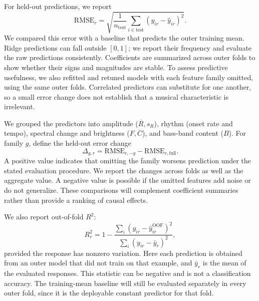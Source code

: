 For held-out predictions, we report
\begin{equation}
 \mathrm{RMSE}_r=
 \sqrt{\frac{1}{n_{\mathrm{test}}}\sum_{i\in\mathrm{test}}
 (y_{ir}-\widehat y_{ir})^2}.
\end{equation}
We compared this error with a baseline that predicts the outer training mean. Ridge predictions can fall outside $[0,1]$; we report their frequency and evaluate the raw predictions consistently. Coefficients are summarized across outer folds to show whether their signs and magnitudes are stable. To assess predictive usefulness, we also refitted and retuned models with each feature family omitted, using the same outer folds. Correlated predictors can substitute for one another, so a small error change does not establish that a musical characteristic is irrelevant.

We grouped the predictors into amplitude ($\overline R,s_R$), rhythm (onset rate and tempo), spectral change and brightness ($F,\overline C$), and bass-band content ($B$). For family $g$, define the held-out error change
\begin{equation}
 \Delta_{g,r}=\mathrm{RMSE}_{r,-g}-\mathrm{RMSE}_{r,\mathrm{full}}.
\end{equation}
A positive value indicates that omitting the family worsens prediction under the stated evaluation procedure. We report the changes across folds as well as the aggregate value. A negative value is possible if the omitted features add noise or do not generalize. These comparisons will complement coefficient summaries rather than provide a ranking of causal effects.

We also report out-of-fold $R^2$:
\begin{equation}
 R^2_r=1-\frac{\sum_i(y_{ir}-\widehat y^{\mathrm{OOF}}_{ir})^2}
 {\sum_i(y_{ir}-\bar y_r)^2},
\end{equation}
provided the response has nonzero variation. Here each prediction is obtained from an outer model that did not train on that example, and $\bar y_r$ is the mean of the evaluated responses. This statistic can be negative and is not a classification accuracy. The training-mean baseline will still be evaluated separately in every outer fold, since it is the deployable constant predictor for that fold.

